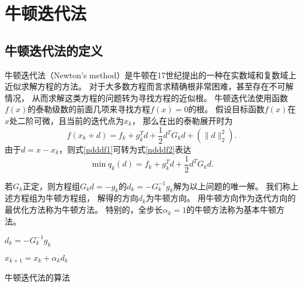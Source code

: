 \section{牛顿迭代法}
\subsection{牛顿迭代法的定义}
    牛顿迭代法（Newton's method）是牛顿在17世纪提出的一种在实数域和复数域上近似求解方程的方法。
    对于大多数方程而言求精确根非常困难，甚至存在不可解情况，
    从而求解这类方程的问题转为寻找方程的近似根。
    牛顿迭代法使用函数$f(x)$的泰勒级数的前面几项来寻找方程$f(x)=0$的根。
    假设目标函数$f(x)$在$x$处二阶可微，且当前的迭代点为$x_k$，
    那么在出的泰勒展开时为
    \begin{equation}\label{ndddf1}
        f(x_k+d) = f_k + g_k^Td+\frac{1}{2}d^TG_kd + (\|d\|_2^2).
    \end{equation}
    由于$d = x - x_k$，则式\ref{ndddf1}可转为式\ref{ndddf2}表达
    \begin{equation}\label{ndddf2}
        \mathop{\mathrm{min}} q_k(d) = f_k + g_k^Td+\frac{1}{2}d^TG_kd.
    \end{equation}

    若$G_k$正定，则方程组$G_kd=-g_k$的$d_k=-G_k^{-1}g_k$解为以上问题的唯一解。
    我们称上述方程组为牛顿方程组，
    解得的方向$d_k$为牛顿方向。
    用牛顿方向作为迭代方向的最优化方法称为牛顿方法。
    特别的，全步长$\alpha_k=1$的牛顿方法称为基本牛顿方法。

    
    
    
    
    
    \begin{algorithm}
    
        \SetAlgoLined
    
         {
            $d_k=-G_k^{-1}g_k$
        
            $x_{k+1}=x_k+\alpha_kd_k$
        }
        \caption{牛顿迭代法的算法}
    \end{algorithm}
    
